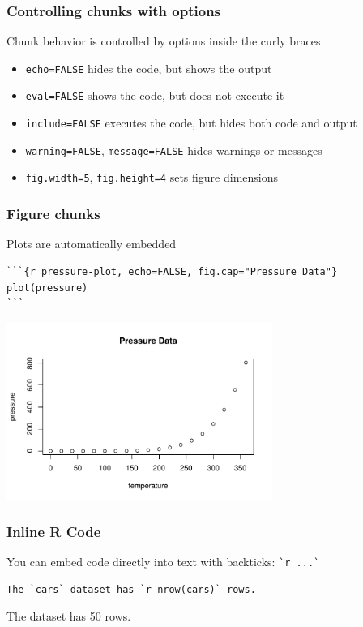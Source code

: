 \documentclass[aspectratio=169]{beamer}\usepackage[]{graphicx}\usepackage[]{xcolor}
\newenvironment{knitrout}{}{} %
\begin{document}
\begin{frame}[fragile]
  \frametitle{Controlling chunks with options}
  Chunk behavior is controlled by options inside the curly braces
  \vfill
  \begin{itemize}
    \item \verb|echo=FALSE| hides the  code, but shows the output
    \vfill
    \item \verb|eval=FALSE| shows the code, but does not execute it
    \vfill
    \item \verb|include=FALSE| executes the code, but hides both code and output
    \vfill
    \item \verb|warning=FALSE|, \verb|message=FALSE| hides warnings or messages
    \vfill
    \item \verb|fig.width=5|, \verb|fig.height=4| sets figure dimensions
  \end{itemize}
\end{frame}

\begin{frame}[fragile]
  \frametitle{Figure chunks}
  Plots are automatically embedded
\begin{lstlisting}
```{r pressure-plot, echo=FALSE, fig.cap="Pressure Data"}
plot(pressure)
```
\end{lstlisting}

\begin{center}
\begin{knitrout}
\color{fgcolor}
\includegraphics[width=0.65\textwidth]{FIGS/L02-pressure-plot-rmd-1} 
\end{knitrout}
\end{center}
\end{frame}

\begin{frame}[fragile]
  \frametitle{Inline R Code}
  You can embed  code directly into text with backticks: \verb|`r ...`|
  \vfill
\begin{lstlisting}
The `cars` dataset has `r nrow(cars)` rows.
\end{lstlisting}
  \vfill
  The  dataset has 50 rows.
\end{frame}
\end{document}
